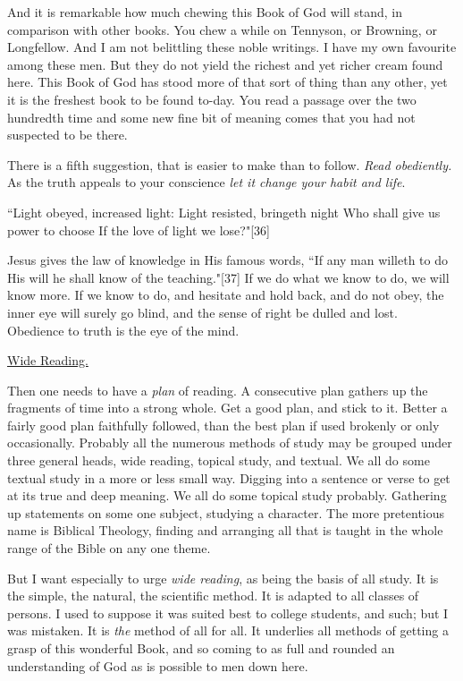 And it is remarkable how much chewing this Book of God will stand, in
comparison with other books. You chew a while on Tennyson, or Browning, or
Longfellow. And I am not belittling these noble writings. I have my own
favourite among these men. But they do not yield the richest and yet
richer cream found here. This Book of God has stood more of that sort of
thing than any other, yet it is the freshest book to be found to-day. You
read a passage over the two hundredth time and some new fine bit of
meaning comes that you had not suspected to be there.

There is a fifth suggestion, that is easier to make than to follow. \textit{Read
obediently.} As the truth appeals to your conscience \textit{let it change your
habit and life}.

    ``Light obeyed, increased light:
    Light resisted, bringeth night
    Who shall give us power to choose
    If the love of light we lose?"[36]

Jesus gives the law of knowledge in His famous words, ``If any man willeth
to do His will he shall know of the teaching."[37] If we do what we know
to do, we will know more. If we know to do, and hesitate and hold back,
and do not obey, the inner eye will surely go blind, and the sense of
right be dulled and lost. Obedience to truth is the eye of the mind.



\underline{Wide Reading.}


Then one needs to have a \textit{plan} of reading. A consecutive plan gathers up
the fragments of time into a strong whole. Get a good plan, and stick to
it. Better a fairly good plan faithfully followed, than the best plan if
used brokenly or only occasionally. Probably all the numerous methods of
study may be grouped under three general heads, wide reading, topical
study, and textual. We all do some textual study in a more or less small
way. Digging into a sentence or verse to get at its true and deep meaning.
We all do some topical study probably. Gathering up statements on some one
subject, studying a character. The more pretentious name is Biblical
Theology, finding and arranging all that is taught in the whole range of
the Bible on any one theme.

But I want especially to urge \textit{wide reading}, as being the basis of all
study. It is the simple, the natural, the scientific method. It is adapted
to all classes of persons. I used to suppose it was suited best to college
students, and such; but I was mistaken. It is \textit{the} method of all for all.
It underlies all methods of getting a grasp of this wonderful Book, and so
coming to as full and rounded an understanding of God as is possible to
men down here.

